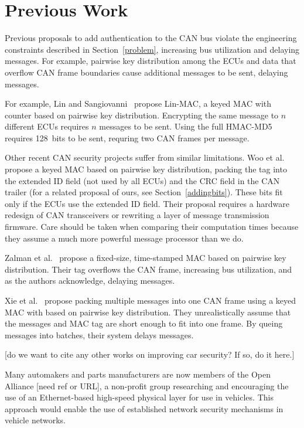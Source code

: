 \section{Previous Work}
\label{previous}

Previous proposals to add authentication to the CAN bus violate the engineering constraints described
in Section~\ref{problem}, increasing bus utilization and delaying messages.  For example, pairwise
key distribution among the ECUs and data that overflow CAN frame boundaries cause additional messages to be sent,
delaying messages.

For example, Lin and Sangiovanni~\cite{Lin-MAC} propose Lin-MAC, a keyed MAC with counter based on
pairwise key distribution.  Encrypting the same message to $n$ different ECUs requires $n$
messages to be sent.   Using the full HMAC-MD5 requires 128~bits to be sent, requring two CAN frames per message.

Other recent CAN security projects suffer from similar limitations. 
Woo et al.~\cite{Woo-14} propose a keyed MAC based on pairwise key distribution,
packing the tag into the extended ID field (not used by all ECUs) and the CRC field in the CAN trailer
(for a related proposal of ours, see Section~\ref{addingbits}). 
These bits fit only if the ECUs use the extended ID field. 
Their proposal requires a hardware redesign of CAN transceivers or rewriting a layer of message transmission firmware.
Care should be taken when comparing their computation times because
they assume a much more powerful message processor than we do. 


Zalman et al.~\cite{Zalman-14} propose a fixed-size, time-stamped MAC based on pairwise key distribution.
Their tag overflows the CAN frame, increasing bus utilization, and as the authors acknowledge,
delaying messages.

Xie et al.~\cite{Xie-15} propose packing multiple messages into one CAN frame using a keyed MAC with 
based on pairwise key distribution.   They unrealistically assume that the messages and MAC tag are short
enough to fit into one frame.  By queing messages into batches, their system delays messages.

[do we want to cite any other works on improving car security? If so, do it here.]

Many automakers and parts manufacturers are now members of the Open Alliance [need ref or URL], 
a non-profit group researching and encouraging the use of an Ethernet-based high-speed physical layer 
for use in vehicles.  This approach would enable the use of 
established network security mechanisms in vehicle networks.

